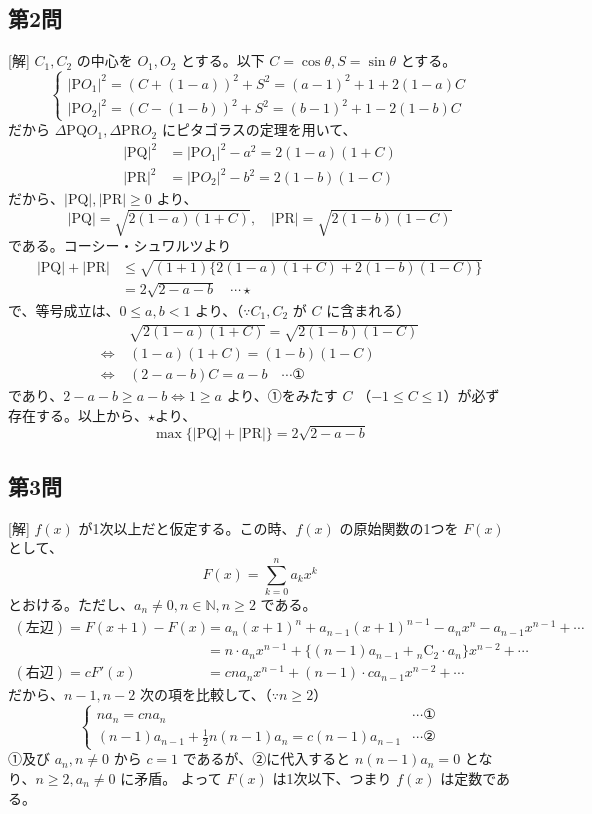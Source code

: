 \documentclass[../main.tex]{subfiles}
\begin{document}
\subsection*{第2問}
[解] $C_1, C_2$ の中心を $O_1, O_2$ とする。以下 $C = \cos\theta, S = \sin\theta$ とする。
\[
  \begin{cases}
    |\text{P}O_1|^2 = (C+(1-a))^2 + S^2 = (a-1)^2+1+2(1-a)C \\
    |\text{P}O_2|^2 = (C-(1-b))^2 + S^2 = (b-1)^2+1-2(1-b)C
  \end{cases}
\]
だから $\Delta \text{PQ}O_1, \Delta \text{PR}O_2$ にピタゴラスの定理を用いて、
\begin{align*}
  |\text{PQ}|^2 &= |\text{P}O_1|^2 - a^2 = 2(1-a)(1+C) \\
  |\text{PR}|^2 &= |\text{P}O_2|^2 - b^2 = 2(1-b)(1-C)
\end{align*}
だから、$|\text{PQ}|, |\text{PR}| \ge 0$ より、
\[
  |\text{PQ}| = \sqrt{2(1-a)(1+C)}, \quad |\text{PR}| = \sqrt{2(1-b)(1-C)}
\]
である。コーシー・シュワルツより
\begin{align*}
  |\text{PQ}|+|\text{PR}| &\le \sqrt{(1+1)\{2(1-a)(1+C) + 2(1-b)(1-C)\}} \\
  &= 2\sqrt{2-a-b} \quad \cdots \star
\end{align*}
で、等号成立は、$0 \le a, b < 1$ より、（$\because C_1, C_2$ が $C$ に含まれる）
\begin{align*}
  &\sqrt{2(1-a)(1+C)} = \sqrt{2(1-b)(1-C)} \\
  \Leftrightarrow\ & (1-a)(1+C) = (1-b)(1-C) \\
  \Leftrightarrow\ & (2-a-b)C = a-b \quad \cdots \text{①}
\end{align*}
であり、$2-a-b \ge a-b \Leftrightarrow 1 \ge a$ より、①をみたす $C$ （$-1 \le C \le 1$）が必ず存在する。以上から、$\star$より、
\[
  \max\{|\text{PQ}|+|\text{PR}|\} = 2\sqrt{2-a-b}
\]

\subsection*{第3問}
[解] $f(x)$ が1次以上だと仮定する。この時、$f(x)$ の原始関数の1つを $F(x)$ として、
\[
  F(x) = \sum_{k=0}^n a_k x^k
\]
とおける。ただし、$a_n \neq 0, n \in \mathbb{N}, n \ge 2$ である。
\begin{align*}
  (\text{左辺}) = F(x+1)-F(x) &= a_n(x+1)^n + a_{n-1}(x+1)^{n-1} - a_n x^n - a_{n-1} x^{n-1} + \cdots \\
  &= n \cdot a_n x^{n-1} + \{ (n-1)a_{n-1} + {}_n\text{C}_2 \cdot a_n \} x^{n-2} + \cdots \\
  (\text{右辺}) = c F'(x) &= c n a_n x^{n-1} + (n-1) \cdot c a_{n-1} x^{n-2} + \cdots
\end{align*}
だから、$n-1, n-2$ 次の項を比較して、（$\because n \ge 2$）
\[
  \begin{cases}
    n a_n = c n a_n & \cdots \text{①} \\
    (n-1)a_{n-1} + \frac{1}{2}n(n-1)a_n = c(n-1)a_{n-1} & \cdots \text{②}
  \end{cases}
\]
①及び $a_n, n \neq 0$ から $c=1$ であるが、②に代入すると $n(n-1)a_n = 0$ となり、$n \ge 2, a_n \neq 0$ に矛盾。
よって $F(x)$ は1次以下、つまり $f(x)$ は定数である。
\end{document}
